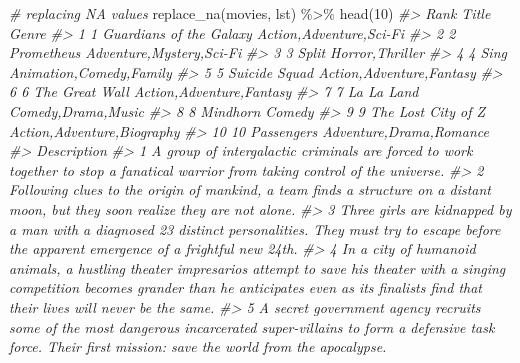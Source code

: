 \documentclass[
]{book}
\newenvironment{Shaded}{\begin{snugshade}}{\end{snugshade}}
\newcommand{\CommentTok}[1]{\textcolor[rgb]{0.56,0.35,0.01}{\textit{#1}}}
\newcommand{\DecValTok}[1]{\textcolor[rgb]{0.00,0.00,0.81}{#1}}
\newcommand{\FunctionTok}[1]{\textcolor[rgb]{0.00,0.00,0.00}{#1}}
\newcommand{\NormalTok}[1]{#1}
\newcommand{\SpecialCharTok}[1]{\textcolor[rgb]{0.00,0.00,0.00}{#1}}
\begin{document}
\begin{Shaded}
\begin{Highlighting}[]
\CommentTok{\# replacing NA values}
\FunctionTok{replace\_na}\NormalTok{(movies, lst) }\SpecialCharTok{\%\textgreater{}\%}
\FunctionTok{head}\NormalTok{(}\DecValTok{10}\NormalTok{)}
\CommentTok{\#\textgreater{}    Rank                   Title                      Genre}
\CommentTok{\#\textgreater{} 1     1 Guardians of the Galaxy    Action,Adventure,Sci{-}Fi}
\CommentTok{\#\textgreater{} 2     2              Prometheus   Adventure,Mystery,Sci{-}Fi}
\CommentTok{\#\textgreater{} 3     3                   Split            Horror,Thriller}
\CommentTok{\#\textgreater{} 4     4                    Sing    Animation,Comedy,Family}
\CommentTok{\#\textgreater{} 5     5           Suicide Squad   Action,Adventure,Fantasy}
\CommentTok{\#\textgreater{} 6     6          The Great Wall   Action,Adventure,Fantasy}
\CommentTok{\#\textgreater{} 7     7              La La Land         Comedy,Drama,Music}
\CommentTok{\#\textgreater{} 8     8                Mindhorn                     Comedy}
\CommentTok{\#\textgreater{} 9     9      The Lost City of Z Action,Adventure,Biography}
\CommentTok{\#\textgreater{} 10   10              Passengers    Adventure,Drama,Romance}
\CommentTok{\#\textgreater{}                                                                                                                                                                                                                                        Description}
\CommentTok{\#\textgreater{} 1                                                                                                                  A group of intergalactic criminals are forced to work together to stop a fanatical warrior from taking control of the universe.}
\CommentTok{\#\textgreater{} 2                                                                                                                  Following clues to the origin of mankind, a team finds a structure on a distant moon, but they soon realize they are not alone.}
\CommentTok{\#\textgreater{} 3                                                                                    Three girls are kidnapped by a man with a diagnosed 23 distinct personalities. They must try to escape before the apparent emergence of a frightful new 24th.}
\CommentTok{\#\textgreater{} 4                   In a city of humanoid animals, a hustling theater impresario\textquotesingle{}s attempt to save his theater with a singing competition becomes grander than he anticipates even as its finalists\textquotesingle{} find that their lives will never be the same.}
\CommentTok{\#\textgreater{} 5                                                              A secret government agency recruits some of the most dangerous incarcerated super{-}villains to form a defensive task force. Their first mission: save the world from the apocalypse.}

\end{Highlighting}
\end{Shaded}
\end{document}

